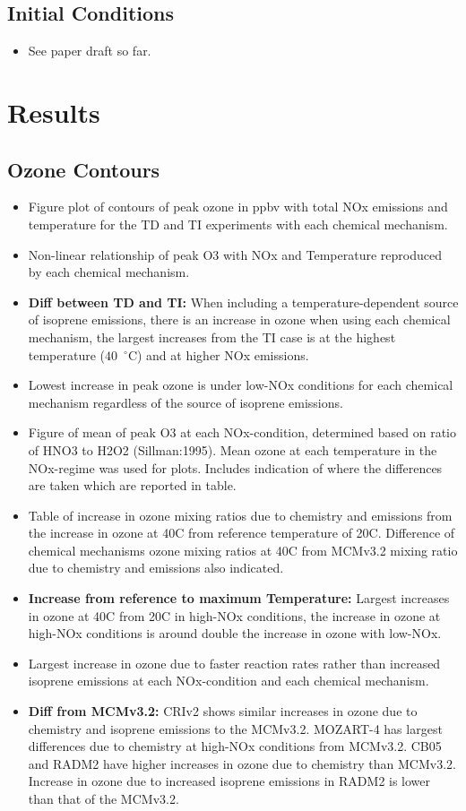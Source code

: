 \documentclass[11pt,a4paper]{article}
\begin{document}
\subsection{Initial Conditions}
\begin{itemize}
    \item See paper draft so far.
\end{itemize}

\section{Results} \label{s:results}
\subsection{Ozone Contours}
\begin{itemize}
    \item Figure plot of contours of peak ozone in ppbv with total NOx emissions and temperature for the TD and TI experiments with each chemical mechanism.
    \item Non-linear relationship of peak O3 with NOx and Temperature reproduced by each chemical mechanism.
    \item \textbf{Diff between TD and TI:} When including a temperature-dependent source of isoprene emissions, there is an increase in ozone when using each chemical mechanism, the largest increases from the TI case is at the highest temperature ($40$~$^{\circ}$C) and at higher NOx emissions. 
    \item Lowest increase in peak ozone is under low-NOx conditions for each chemical mechanism regardless of the source of isoprene emissions.
    \item Figure of mean of peak O3 at each NOx-condition, determined based on ratio of HNO3 to H2O2 (Sillman:1995). Mean ozone at each temperature in the NOx-regime was used for plots. Includes indication of where the differences are taken which are reported in table.
    \item Table of increase in ozone mixing ratios due to chemistry and emissions from the increase in ozone at 40C from reference temperature of 20C. Difference of chemical mechanisms ozone mixing ratios at 40C from MCMv3.2 mixing ratio due to chemistry and emissions also indicated.
    \item \textbf{Increase from reference to maximum Temperature:} Largest increases in ozone at 40C from 20C in high-NOx conditions, the increase in ozone at high-NOx conditions is around double the increase in ozone with low-NOx.
    \item Largest increase in ozone due to faster reaction rates rather than increased isoprene emissions at each NOx-condition and each chemical mechanism.
    \item \textbf{Diff from MCMv3.2:} CRIv2 shows similar increases in ozone due to chemistry and isoprene emissions to the MCMv3.2. MOZART-4 has largest differences due to chemistry at high-NOx conditions from MCMv3.2. CB05 and RADM2 have higher increases in ozone due to chemistry than MCMv3.2. Increase in ozone due to increased isoprene emissions in RADM2 is lower than that of the MCMv3.2.
\end{itemize}
\end{document}
